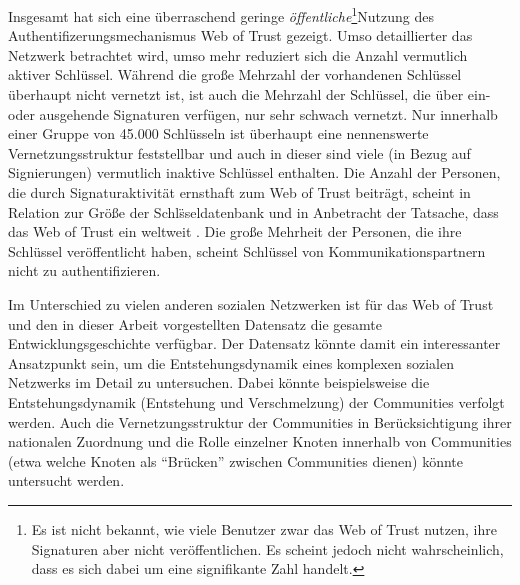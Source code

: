 Insgesamt hat sich eine überraschend geringe
\emph{öffentliche}\footnote{Es ist nicht bekannt, wie viele Benutzer
  zwar das Web of Trust nutzen, ihre Signaturen aber nicht
  veröffentlichen. Es scheint jedoch nicht wahrscheinlich, dass es
  sich dabei um eine signifikante Zahl handelt.}Nutzung des
Authentifizerungsmechanismus Web of Trust gezeigt. Umso detaillierter
das Netzwerk betrachtet wird, umso mehr reduziert sich die Anzahl
vermutlich aktiver Schl\"ussel. W\"ahrend die gro{\ss}e Mehrzahl der
vorhandenen Schl\"ussel \"uberhaupt nicht vernetzt ist, ist auch die
Mehrzahl der Schl\"ussel, die \"uber ein- oder ausgehende Signaturen
verf\"ugen, nur sehr schwach vernetzt. Nur innerhalb einer Gruppe
von 45.000 Schlüsseln ist überhaupt eine nennenswerte
Vernetzungsstruktur feststellbar und auch in dieser sind viele (in
Bezug auf Signierungen) vermutlich inaktive Schlüssel enthalten. Die
Anzahl der Personen, die durch Signaturaktivit\"at ernsthaft zum Web of Trust
beiträgt, scheint in Relation zur Gr\"o{\ss}e der Schl\"sseldatenbank
und in Anbetracht der Tatsache, dass das Web of Trust ein weltweit . Die große Mehrheit der Personen, die
ihre Schlüssel veröffentlicht haben, scheint Schlüssel von
Kommunikationspartnern nicht zu authentifizieren.

Im Unterschied zu vielen anderen sozialen Netzwerken ist f\"ur das Web
of Trust und den in dieser Arbeit vorgestellten Datensatz die
gesamte Entwicklungsgeschichte verfügbar. Der 
Datensatz könnte damit ein interessanter Ansatzpunkt
sein, um die Entstehungsdynamik eines komplexen sozialen Netzwerks im
Detail zu untersuchen. Dabei könnte beispielsweise die
Entstehungsdynamik (Entstehung und Verschmelzung) der Communities
verfolgt werden. Auch die Vernetzungsstruktur der Communities in
Berücksichtigung ihrer nationalen Zuordnung und die Rolle einzelner
Knoten innerhalb von Communities (etwa welche Knoten als "`Brücken"'
zwischen Communities dienen) könnte untersucht
werden.

